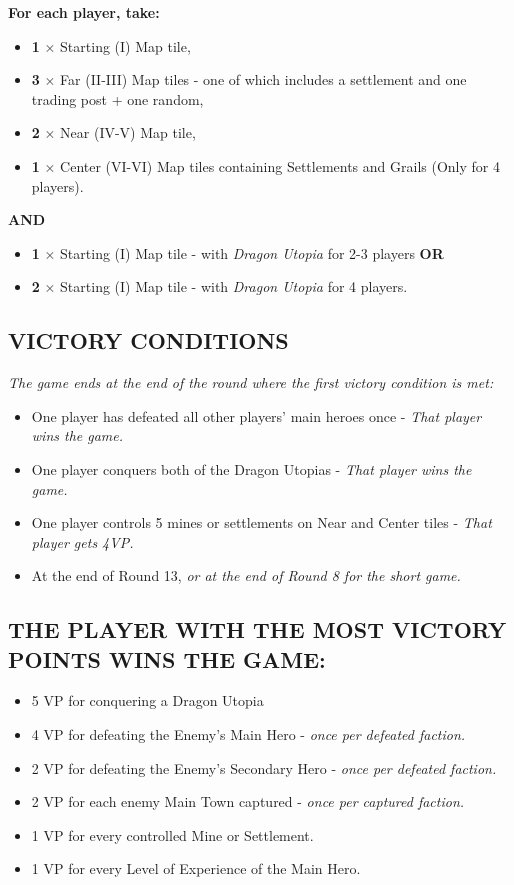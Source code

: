 \begin{multicols*}{2}
\textbf{For each player, take:}
\begin{itemize}
  \item \textbf{1} × Starting (I) Map tile,
  \item \textbf{3} × Far (II-III) Map tiles - one of which includes a settlement and one trading post + one random,
  \item \textbf{2} × Near (IV-V) Map tile,
  \item \textbf{1} × Center (VI-VI) Map tiles containing Settlements and Grails (Only for 4 players).
\end{itemize}
\textbf{AND}

\begin{itemize}
  \item \textbf{1} × Starting (I) Map tile - with \textit{Dragon Utopia} for 2-3 players \textbf{OR}
  \item \textbf{2} × Starting (I) Map tile - with \textit{Dragon Utopia} for 4 players.
\end{itemize}

\subsection*{\MakeUppercase{Victory Conditions}}
\textit{The game ends at the end of the round where the first victory condition is met:}
\begin{itemize}
  \item One player has defeated all other players’ main heroes once - \textit{That player wins the game.}
  \item One player conquers both of the Dragon Utopias - \textit{That player wins the game.}
  \item One player controls 5 mines or settlements on Near and Center tiles - \textit{That player gets 4VP.}
  \item At the end of Round 13, \textit{or at the end of Round 8 for the short game.}
\end{itemize}

\subsection*{\MakeUppercase{The player with the most Victory Points wins the game:}}
\begin{itemize}
  \item 5 VP for conquering a Dragon Utopia
  \item 4 VP for defeating the Enemy’s Main Hero - \textit{once per defeated faction.}
  \item 2 VP for defeating the Enemy’s Secondary Hero - \textit{once per defeated faction.}
  \item 2 VP for each enemy Main Town captured - \textit{once per captured faction.}
  \item 1 VP for every controlled Mine or Settlement.
  \item 1 VP for every Level of Experience of the Main Hero.
\end{itemize}


\end{multicols*}
